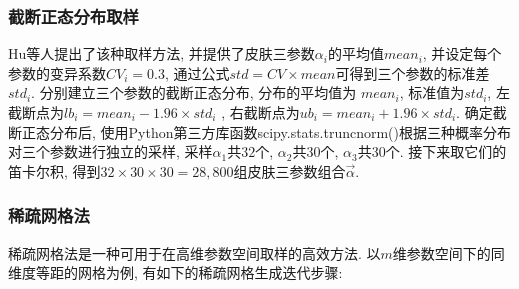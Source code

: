 \documentclass[a4paper,punct=banjiao,twoside]{ctexrep}
\theoremstyle{plain}
\theoremstyle{definition}
\theoremstyle{remark}
\begin{document}
\subsubsection*{截断正态分布取样}
Hu等人\cite{11}提出了该种取样方法, 并提供了皮肤三参数$\alpha_i$的平均值$mean_i$, 并设定每个参数的变异系数$CV_i = 0.3$, 通过公式$std = CV\times mean$可得到三个参数的标准差$std_i$. 分别建立三个参数的截断正态分布, 分布的平均值为
$mean_i$, 标准值为$std_i$, 左截断点为$lb_i = mean_i - 1.96\times std_i$ , 右截断点为$ub_i = mean_i + 1.96\times std_i$. 确定截断正态分布后, 使用Python第三方库函数scipy.stats.truncnorm()根据三种概率分布
对三个参数进行独立的采样, 采样$\alpha_1$共$32$个, $\alpha_2$共$30$个, $\alpha_3$共$30$个. 接下来取它们的笛卡尔积, 得到$32 \times 30 \times 30 = 28,800$组皮肤三参数组合$\vec{\alpha}$. 

\subsubsection*{稀疏网格法}

稀疏网格法\cite{15,18}是一种可用于在高维参数空间取样的高效方法. 以$m$维参数空间下的同维度等距的网格为例, 有如下的稀疏网格生成迭代步骤:
\end{document}
